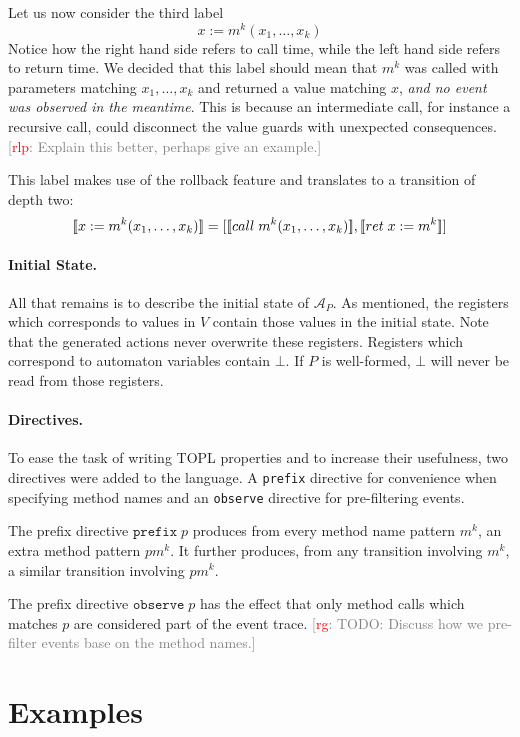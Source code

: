 \documentclass[9pt, preprint]{sigplanconf} %
\newcommand{\noterg}[2]{\textcolor{gray}{[\textcolor{red}{#1}: #2]}}
\newcommand{\rg}[1]{\noterg{rg}{#1}}
\newcommand{\rlp}[1]{\noterg{rlp}{#1}}
\newcommand{\A}{\ensuremath{\mathcal{A}}}
\theoremstyle{definition}
\theoremstyle{remark}
\begin{document}
Let us now consider the third label
\[
x := m^k(x_1, \ldots, x_k)
\]
Notice how the right hand side refers to call time, while the left
hand side refers to return time. We decided that this label should
mean that $m^k$ was called with parameters matching $x_1, \ldots, x_k$
and returned a value matching $x$, \emph{and no event was observed in
  the meantime}. This is because an intermediate call, for instance a
recursive call, could disconnect the value guards with unexpected
consequences. \rlp{Explain this better, perhaps give an example.}

This label makes use of the rollback feature and translates to a
transition of depth two:
\[
[\![x := m^k(x_1, \ldots, x_k)]\!]
=
[[\![call\;m^k(x_1, \ldots, x_k)]\!], [\![ret\;x := m^k]\!]]
\]

\paragraph{Initial State.}
All that remains is to describe the initial state of $\A_P$.
As mentioned, the registers which corresponds to values in $V$
contain those values in the initial state. Note that the generated
actions never overwrite these registers. Registers which correspond
to automaton variables contain $\bot$. If $P$ is well-formed, $\bot$
will never be read from those registers.

\paragraph{Directives.}
To ease the task of writing TOPL properties and to increase their
usefulness, two directives were added to the language. A \texttt{prefix}
directive for convenience when specifying method names and an
\texttt{observe} directive for pre-filtering events.

The prefix directive $\mathtt{prefix}\; p$ produces from every
method name pattern $m^k$, an extra method pattern $pm^k$. It further
produces, from any transition involving $m^k$, a similar transition
involving $pm^k$.

The prefix directive $\mathtt{observe}\; p$ has the effect that only
method calls which matches $p$ are considered part of the event trace.
\rg{TODO: Discuss how we pre-filter events base on the method names.}


\section{Examples} \label{sec:examples} %
\end{document}

